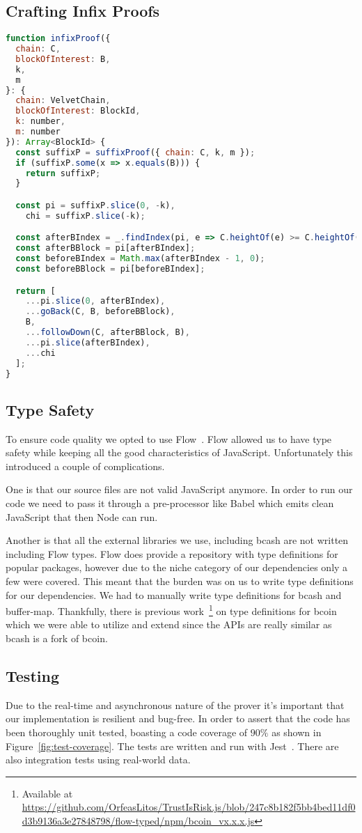 \subsection{Crafting Infix Proofs}
\begin{lstlisting}[language=Javascript]
function infixProof({
  chain: C,
  blockOfInterest: B,
  k,
  m
}: {
  chain: VelvetChain,
  blockOfInterest: BlockId,
  k: number,
  m: number
}): Array<BlockId> {
  const suffixP = suffixProof({ chain: C, k, m });
  if (suffixP.some(x => x.equals(B))) {
    return suffixP;
  }

  const pi = suffixP.slice(0, -k),
    chi = suffixP.slice(-k);

  const afterBIndex = _.findIndex(pi, e => C.heightOf(e) >= C.heightOf(B));
  const afterBBlock = pi[afterBIndex];
  const beforeBIndex = Math.max(afterBIndex - 1, 0);
  const beforeBBlock = pi[beforeBIndex];

  return [
    ...pi.slice(0, afterBIndex),
    ...goBack(C, B, beforeBBlock),
    B,
    ...followDown(C, afterBBlock, B),
    ...pi.slice(afterBIndex),
    ...chi
  ];
}
\end{lstlisting}

\subsection{Type Safety}
To ensure code quality we opted to use Flow~\cite{flow}. Flow allowed us to have type safety while keeping all the good characteristics of JavaScript. Unfortunately this introduced a couple of complications.

One is that our source files are not valid JavaScript anymore. In order to run our code we need to pass it through a pre-processor like Babel which emits clean JavaScript that then Node can run.

Another is that all the external libraries we use, including bcash are not written including Flow types. Flow does provide a repository with type definitions for popular packages, however due to the niche category of our dependencies only a few were covered. This meant that the burden was on us to write type definitions for our dependencies. We had to manually write type definitions for bcash and buffer-map. Thankfully, there is previous work~\footnote{Available at \url{https://github.com/OrfeasLitos/TrustIsRisk.js/blob/247c8b182f5bb4bed11df0d3b9136a3e27848798/flow-typed/npm/bcoin_vx.x.x.js}} on type definitions for bcoin which we were able to utilize and extend since the APIs are really similar as bcash is a fork of bcoin.

\subsection{Testing}
Due to the real-time and asynchronous nature of the prover it's important that our implementation is resilient and bug-free. In order to assert that the code has been thoroughly unit tested, boasting a code coverage of $90\%$ as shown in Figure~\ref{fig:test-coverage}. The tests are written and run with Jest~\cite{jest}. There are also integration tests using real-world data.

